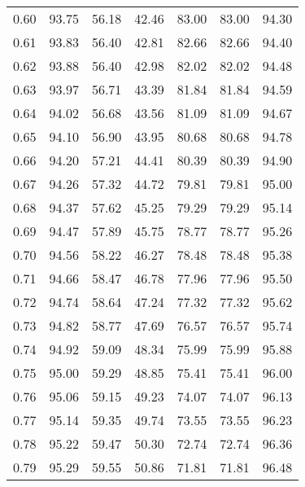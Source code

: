 \begin{tabular}{|c|c|c|c|c|c|c|}
      0.60 &     93.75 &     56.18 &      42.46 &   83.00 &      83.00 &         94.30 \\
      0.61 &     93.83 &     56.40 &      42.81 &   82.66 &      82.66 &         94.40 \\
      0.62 &     93.88 &     56.40 &      42.98 &   82.02 &      82.02 &         94.48 \\
      0.63 &     93.97 &     56.71 &      43.39 &   81.84 &      81.84 &         94.59 \\
      0.64 &     94.02 &     56.68 &      43.56 &   81.09 &      81.09 &         94.67 \\
      0.65 &     94.10 &     56.90 &      43.95 &   80.68 &      80.68 &         94.78 \\
      0.66 &     94.20 &     57.21 &      44.41 &   80.39 &      80.39 &         94.90 \\
      0.67 &     94.26 &     57.32 &      44.72 &   79.81 &      79.81 &         95.00 \\
      0.68 &     94.37 &     57.62 &      45.25 &   79.29 &      79.29 &         95.14 \\
      0.69 &     94.47 &     57.89 &      45.75 &   78.77 &      78.77 &         95.26 \\
      0.70 &     94.56 &     58.22 &      46.27 &   78.48 &      78.48 &         95.38 \\
      0.71 &     94.66 &     58.47 &      46.78 &   77.96 &      77.96 &         95.50 \\
      0.72 &     94.74 &     58.64 &      47.24 &   77.32 &      77.32 &         95.62 \\
      0.73 &     94.82 &     58.77 &      47.69 &   76.57 &      76.57 &         95.74 \\
      0.74 &     94.92 &     59.09 &      48.34 &   75.99 &      75.99 &         95.88 \\
      0.75 &     95.00 &     59.29 &      48.85 &   75.41 &      75.41 &         96.00 \\
      0.76 &     95.06 &     59.15 &      49.23 &   74.07 &      74.07 &         96.13 \\
      0.77 &     95.14 &     59.35 &      49.74 &   73.55 &      73.55 &         96.23 \\
      0.78 &     95.22 &     59.47 &      50.30 &   72.74 &      72.74 &         96.36 \\
      0.79 &     95.29 &     59.55 &      50.86 &   71.81 &      71.81 &         96.48 \\

\end{tabular}
